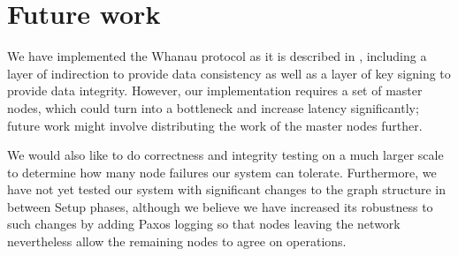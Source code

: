 \documentclass[letter]{article}
\begin{document}
\section{Future work}

We have implemented the Whanau protocol as it is described in
\cite{whanauthesis}, including a layer of indirection to provide
data consistency as well as a layer of key signing to provide
data integrity. However, our implementation requires a set of master
nodes, which could turn into a bottleneck and increase latency
significantly; future work might involve distributing the work of the
master nodes further.

We would also like to do correctness and integrity testing on a much
larger scale to determine how many node failures our system can tolerate.
Furthermore, we have not yet tested our system with significant changes
to the graph structure in between Setup phases, although we believe
we have increased its robustness to such changes by adding Paxos logging
so that nodes leaving the network nevertheless allow the remaining
nodes to agree on operations.

\printbibliography
\nocite{*}
\end{document}
